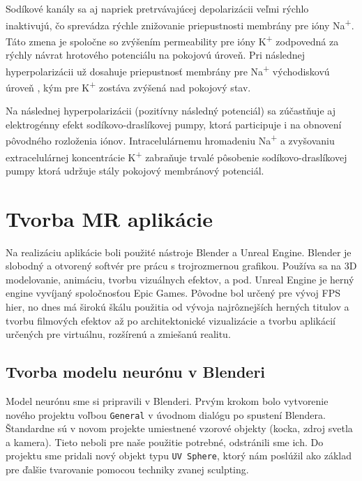 Sodíkové kanály sa aj napriek pretrvávajúcej depolarizácii veľmi rýchlo inaktivujú, čo sprevádza rýchle znižovanie priepustnosti membrány pre ióny Na\textsuperscript{+}. Táto zmena je spoločne 
so zvýšením permeability pre ióny K\textsuperscript{+} zodpovedná za rýchly návrat hrotového potenciálu na pokojovú úroveň. Pri následnej hyperpolarizácii už dosahuje priepustnosť membrány pre 
Na\textsuperscript{+} východiskovú úroveň , kým pre K\textsuperscript{+} zostáva zvýšená nad pokojový stav.

Na následnej hyperpolarizácii (pozitívny následný potenciál) sa zúčastňuje aj elektrogénny efekt sodíkovo-draslíkovej pumpy, ktorá participuje i na obnovení pôvodného rozloženia iónov.
Intracelulárnemu hromadeniu Na\textsuperscript{+} a zvyšovaniu extracelulárnej koncentrácie K\textsuperscript{+} zabraňuje trvalé pôsobenie sodíkovo-draslíkovej pumpy ktorá udržuje stály pokojový 
membránový potenciál. \cite{javorkaLekarskaFyziologiaUcebnica2001}

\section{Tvorba MR aplikácie}

Na realizáciu aplikácie boli použité nástroje Blender a Unreal Engine. Blender je slobodný a otvorený  softvér pre prácu s trojrozmernou grafikou. Používa sa na 3D modelovanie,
animáciu, tvorbu vizuálnych efektov, a pod. Unreal Engine je herný engine vyvíjaný spoločnosťou Epic Games. Pôvodne bol určený pre vývoj FPS hier, no dnes má širokú škálu použitia
od vývoja najrôznejších herných titulov a tvorbu filmových efektov až po architektonické vizualizácie a tvorbu aplikácií určených pre virtuálnu, rozšírenú a zmiešanú realitu.

\subsection{Tvorba modelu neurónu v Blenderi}
Model neurónu sme si pripravili v Blenderi. Prvým krokom bolo vytvorenie nového projektu voľbou \texttt{General} v úvodnom dialógu po spustení Blendera. Štandardne sú v novom projekte 
umiestnené vzorové objekty (kocka, zdroj svetla a kamera). Tieto neboli pre naše použitie potrebné, odstránili sme ich. Do projektu sme pridali nový objekt typu \texttt{UV Sphere}, 
ktorý nám poslúžil ako základ pre ďalšie tvarovanie pomocou techniky zvanej sculpting. 

